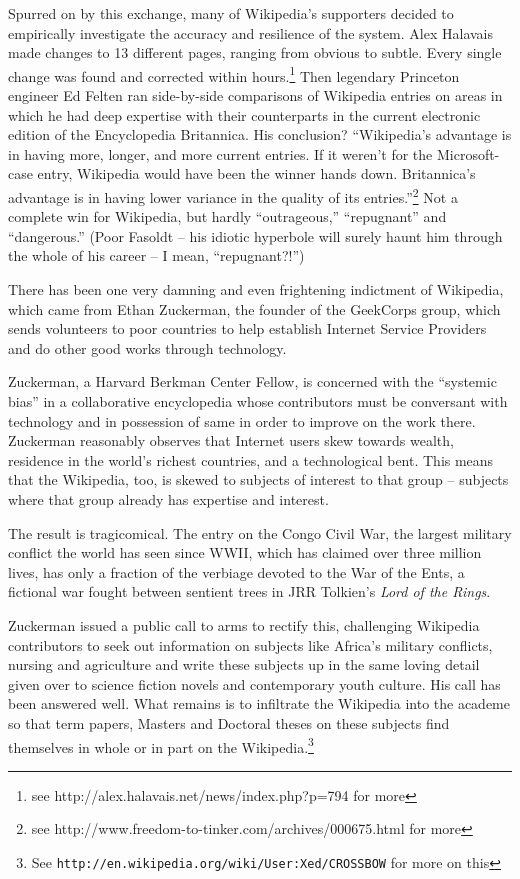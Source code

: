Spurred on by this exchange, many of Wikipedia's supporters decided
to empirically investigate the accuracy and resilience of the
system. Alex Halavais made changes to 13 different pages, ranging
from obvious to subtle. Every single change was found and corrected
within hours.\footnote{
  see http://alex.halavais.net/news/index.php?p=794 for more}
Then legendary Princeton engineer Ed Felten ran
side-by-side comparisons of Wikipedia entries on areas in which he
had deep expertise with their counterparts in the current
electronic edition of the Encyclopedia Britannica. His conclusion?
``Wikipedia's advantage is in having more, longer, and more current
entries. If it weren't for the Microsoft-case entry, Wikipedia
would have been the winner hands down. Britannica's advantage is in
having lower variance in the quality of its entries.''\footnote{
  see http://www.freedom-to-tinker.com/archives/000675.html
  for more}
Not a complete win for Wikipedia, but hardly
``outrageous,'' ``repugnant'' and ``dangerous.'' (Poor Fasoldt -- his
idiotic hyperbole will surely haunt him through the whole of his
career -- I mean, ``repugnant?!'')

There has been one very damning and even frightening indictment of
Wikipedia, which came from Ethan Zuckerman, the founder of the
GeekCorps group, which sends volunteers to poor countries to help
establish Internet Service Providers and do other good works
through technology.

Zuckerman, a Harvard Berkman Center Fellow, is concerned with the
``systemic bias'' in a collaborative encyclopedia whose contributors
must be conversant with technology and in possession of same in
order to improve on the work there. Zuckerman reasonably observes
that Internet users skew towards wealth, residence in the world's
richest countries, and a technological bent. This means that the
Wikipedia, too, is skewed to subjects of interest to that group --
subjects where that group already has expertise and interest.

The result is tragicomical. The entry on the Congo Civil War, the
largest military conflict the world has seen since WWII, which has
claimed over three million lives, has only a fraction of the
verbiage devoted to the War of the Ents, a fictional war fought
between sentient trees in JRR Tolkien's
\emph{Lord of the Rings}.

Zuckerman issued a public call to arms to rectify this, challenging
Wikipedia contributors to seek out information on subjects like
Africa's military conflicts, nursing and agriculture and write
these subjects up in the same loving detail given over to science
fiction novels and contemporary youth culture. His call has been
answered well. What remains is to infiltrate the Wikipedia into the
academe so that term papers, Masters and Doctoral theses on these
subjects find themselves in whole or in part on the Wikipedia.\footnote{
  See \texttt{http://en.wikipedia.org/wiki/User:Xed/CROSSBOW}
  for more on this}


